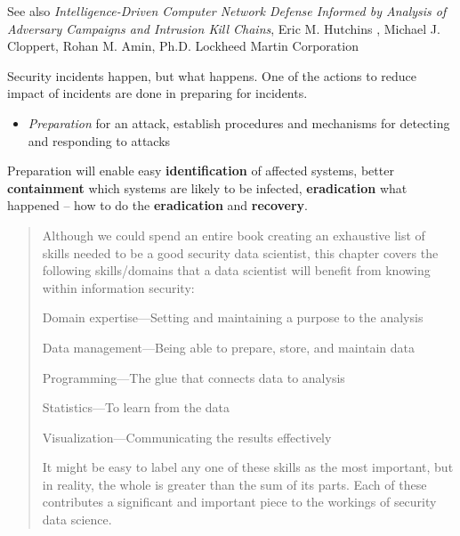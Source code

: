 \documentclass[Screen16to9,17pt]{foils}
\begin{document}


\begin{list2}
\item See also \emph{Intelligence-Driven Computer Network Defense Informed by Analysis of Adversary Campaigns and Intrusion Kill Chains}, Eric M. Hutchins , Michael J. Cloppert, Rohan M. Amin, Ph.D. Lockheed Martin Corporation\\{\footnotesize
 }
\end{list2}





Security incidents happen, but what happens. One of the actions to reduce impact of incidents are done in preparing for incidents.

\begin{itemize}
\item \emph{Preparation} for an attack, establish procedures and mechanisms for detecting and responding to attacks
\end{itemize}

Preparation will enable easy {\bf identification} of affected systems, better {\bf containment} which systems are likely to be infected, {\bf eradication} what happened -- how to do the {\bf eradication} and {\bf recovery}.


\begin{quote}
Although we could spend an entire book creating an exhaustive list of skills needed to be a good security data scientist, this chapter covers the following skills/domains that a data scientist will benefit from
knowing within information security:
\begin{list2}
\item Domain expertise—Setting and maintaining a purpose to the analysis
\item Data management—Being able to prepare, store, and maintain data
\item Programming—The glue that connects data to analysis
\item Statistics—To learn from the data
\item Visualization—Communicating the results effectively
\end{list2}
It might be easy to label any one of these skills as the most important, but in reality, the whole is greater than the sum of its parts. Each of these contributes a significant and important piece to the workings of
security data science.
\end{quote}
\end{document}
